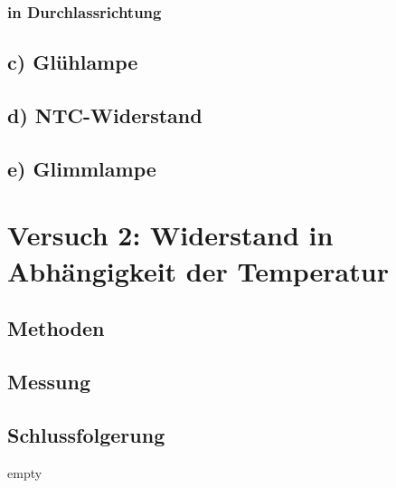 \documentclass[11pt,a4paper,titlepage, ngerman]{article}
\begin{document}
			\subsubsection{in Durchlassrichtung}
			
		\subsection{c) Glühlampe} %

		\subsection{d) NTC-Widerstand} %

		\subsection{e) Glimmlampe} %

	\section{Versuch 2: Widerstand in Abhängigkeit der Temperatur}		

		\subsection{Methoden} %
		
		\subsection{Messung}
		
		\subsection{Schlussfolgerung}		
	
	\newpage	
	\begin{thebibliography}	
		empty
	\end{thebibliography}	
			
\end{document}
